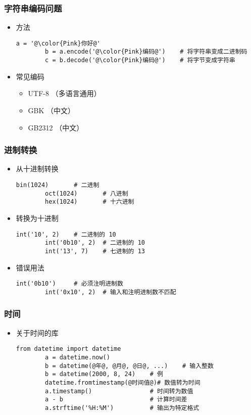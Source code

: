 \begin{CJK}{UTF8}{gbsn}
\begin{frame} [fragile]
	\frametitle{字符串编码问题}
	\linespread{1.25}
	\begin{itemize}
	\item 方法
		\begin{lstlisting}[style=pythonstyle, gobble=8, texcl, escapechar=@]
		a = '@\color{Pink}你好@'
		b = a.encode('@\color{Pink}编码@')	# 将字符串变成二进制码
		c = b.decode('@\color{Pink}编码@')	# 将字节变成字符串
		\end{lstlisting}
	\item 常见编码
		\begin{itemize}
		\item UTF-8 （多语言通用）
		\item GBK （中文）
		\item GB2312 （中文）
		\end{itemize}
	\end{itemize}
\end{frame}

\begin{frame} [fragile]
	\frametitle{进制转换}
	\begin{itemize}
	\item 从十进制转换
		\begin{lstlisting}[style=pythonstyle, gobble=8, texcl]
		bin(1024)		# 二进制
		oct(1024)		# 八进制
		hex(1024)		# 十六进制
		\end{lstlisting}
	\item 转换为十进制
		\begin{lstlisting}[style=pythonstyle, gobble=8, texcl]
		int('10', 2)	# 二进制的 10
		int('0b10', 2)	# 二进制的 10
		int('13', 7)	# 七进制的 13
		\end{lstlisting}
	\item 错误用法
		\begin{lstlisting}[style=pythonstyle, gobble=8, texcl]
		int('0b10')		# 必须注明进制数
		int('0x10', 2)	# 输入和注明进制数不匹配
		\end{lstlisting}
	\end{itemize}
\end{frame}

\begin{frame} [fragile]
	\frametitle{时间}
	\linespread{1.25}
	\begin{itemize}
	\item 关于时间的库
		\begin{lstlisting}[style=pythonstyle, gobble=8, texcl, escapechar=@]
		from datetime import datetime
		a = datetime.now()
		b = datetime(@年@, @月@, @日@, ...)	# 输入整数
		b = datetime(2000, 8, 24)	 # 例
		datetime.fromtimestamp(@时间值@)# 数值转为时间
		a.timestamp()				 # 时间转为数值
		a - b						 # 计算时间差
		a.strftime('%H:%M')			 # 输出为特定格式
		\end{lstlisting}
	\end{itemize}
\end{frame}


\end{CJK}
